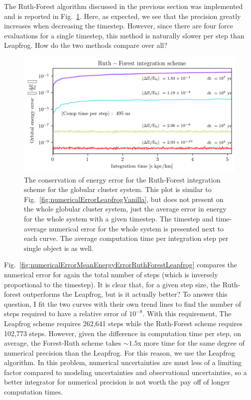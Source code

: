         The Ruth-Forest algorithm discussed in the previous section was implemented and is reported in Fig.~\ref{fig:numericalErrorRuthForest}. Here, as expected, we see that the precision greatly increases when decreasing the timestep. However, since there are four force evaluations for a single timestep, this method is naturally slower per step than Leapfrog. How do the two methods compare over all?
        \begin{figure}
            \centering
            \includegraphics[width=\linewidth]{images/numericalErrorRuthForest.png}
            \caption[Relative orbital energy using the Ruth-Forest scheme]{The conservation of energy error for the Ruth-Forest integration scheme for the globular cluster system. This plot is similar to Fig.~\ref{fig:numericalErrorLeapfrogVanilla}, but does not present on the whole globular cluster system, just the average error in energy for the whole system with a given timestep. The timestep and time-average numerical error for the whole system is presented next to each curve. The average computation time per integration step per single object is as well.}
            \label{fig:numericalErrorRuthForest}
        \end{figure}
        Fig.~\ref{fig:numericalErrorMeanEnergyErrorRuthForestLeapfrog} compares the numerical error for again the total number of steps (which is inversely proportional to the timestep). It is clear that, for a given step size, the Ruth-forest outperforms the Leapfrog, but is it actually better? To answer this question, I fit the two curves with their own trend lines to find the number of steps required to have a relative error of $10^{-8}$. With this requirement, The Leapfrog scheme requires 262,641 steps while the Ruth-Forest scheme requires 102,773 steps. However, given the difference in computation time per step, on average, the Forest-Ruth scheme takes $\sim 1.5$x more time for the same degree of numerical precision than the Leapfrog. For this reason, we use the Leapfrog algorithm. In this problem, numerical uncertainties are must less of a limiting factor compared to modeling uncertainties and observational uncertainties, so a better integrator for numerical precision is not worth the pay off of longer computation times. 
